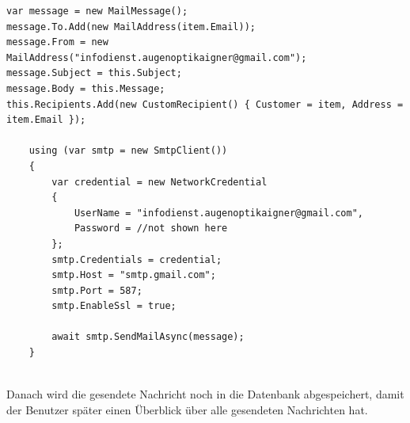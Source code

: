 \begin{lstlisting}
var message = new MailMessage();
message.To.Add(new MailAddress(item.Email));
message.From = new MailAddress("infodienst.augenoptikaigner@gmail.com");
message.Subject = this.Subject;
message.Body = this.Message;
this.Recipients.Add(new CustomRecipient() { Customer = item, Address = item.Email });

	using (var smtp = new SmtpClient())
    {
    	var credential = new NetworkCredential
		{
        	UserName = "infodienst.augenoptikaigner@gmail.com",
            Password = //not shown here
        };
        smtp.Credentials = credential;
        smtp.Host = "smtp.gmail.com";
        smtp.Port = 587;
        smtp.EnableSsl = true;

        await smtp.SendMailAsync(message);
    }
        
\end{lstlisting}
\bigskip
Danach wird die gesendete Nachricht noch in die Datenbank abgespeichert, damit der Benutzer später einen Überblick über alle gesendeten Nachrichten hat.


